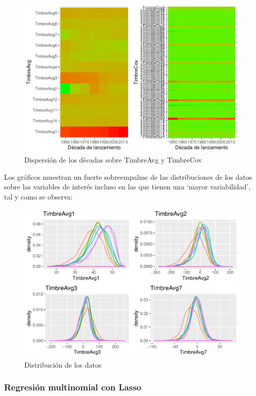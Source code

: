 \documentclass[conference,final,]{IEEEtran}
\begin{document}
\begin{figure}[H]

{\centering \includegraphics[width=0.6\linewidth]{YearPrediction_Reporte_files/figure-latex/unnamed-chunk-12-1} 

}

\caption{Dispersión de los décadas sobre TimbreAvg y TimbreCov }\label{fig:unnamed-chunk-12}
\end{figure}

Los gráficos muestran un fuerte sobreempalme de las distribuciones de
los datos sobre las variables de interés incluso en las que tienen una
`mayor variabilidad', tal y como se observa:

\begin{figure}[H]

{\centering \includegraphics[width=0.6\linewidth]{YearPrediction_Reporte_files/figure-latex/unnamed-chunk-13-1} 

}

\caption{Distribución de los datos}\label{fig:unnamed-chunk-13}
\end{figure}

\hypertarget{regresion-multinomial-con-lasso}{%
\subsubsection{Regresión multinomial con
Lasso}\label{regresion-multinomial-con-lasso}}
\end{document}
